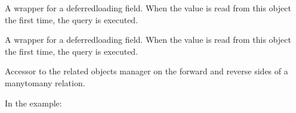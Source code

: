 \documentclass[letterpaper,10pt,english]{sphinxmanual}
\begin{document}
\begin{fulllineitems}
\begin{fulllineitems}
\end{fulllineitems}


\begin{fulllineitems}
\label{\detokenize{users:users.models.courses.id}}
\sphinxAtStartPar
A wrapper for a deferred\sphinxhyphen{}loading field. When the value is read from this
object the first time, the query is executed.

\end{fulllineitems}


\begin{fulllineitems}
\label{\detokenize{users:users.models.courses.objects}}
\end{fulllineitems}


\begin{fulllineitems}
\label{\detokenize{users:users.models.courses.title}}
\sphinxAtStartPar
A wrapper for a deferred\sphinxhyphen{}loading field. When the value is read from this
object the first time, the query is executed.

\end{fulllineitems}


\begin{fulllineitems}
\label{\detokenize{users:users.models.courses.userprofile_set}}
\sphinxAtStartPar
Accessor to the related objects manager on the forward and reverse sides of
a many\sphinxhyphen{}to\sphinxhyphen{}many relation.

\sphinxAtStartPar
In the example:

\begin{sphinxVerbatim}[commandchars=\\\{\}]
 
       
\end{sphinxVerbatim}


\end{fulllineitems}
\end{fulllineitems}
\end{document}
